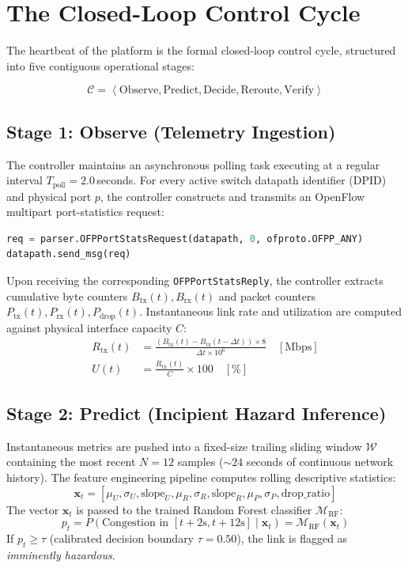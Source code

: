 \section{The Closed-Loop Control Cycle}
The heartbeat of the platform is the formal closed-loop control cycle, structured into five contiguous operational stages:

\begin{equation}
  \mathcal{C} = \left\langle \text{Observe}, \text{Predict}, \text{Decide}, \text{Reroute}, \text{Verify} \right\rangle
\end{equation}

\subsection{Stage 1: Observe (Telemetry Ingestion)}
The controller maintains an asynchronous polling task executing at a regular interval $T_{\text{poll}} = 2.0$\,seconds. For every active switch datapath identifier (DPID) and physical port $p$, the controller constructs and transmits an OpenFlow multipart port-statistics request:
\begin{lstlisting}[language=Python,caption={OpenFlow 1.3 port statistics request dispatch.}]
req = parser.OFPPortStatsRequest(datapath, 0, ofproto.OFPP_ANY)
datapath.send_msg(req)
\end{lstlisting}

Upon receiving the corresponding \texttt{OFPPortStatsReply}, the controller extracts cumulative byte counters $B_{\text{tx}}(t), B_{\text{rx}}(t)$ and packet counters $P_{\text{tx}}(t), P_{\text{rx}}(t), P_{\text{drop}}(t)$. Instantaneous link rate and utilization are computed against physical interface capacity $C$:
\begin{align}
  R_{\text{tx}}(t) &= \frac{(B_{\text{tx}}(t) - B_{\text{tx}}(t - \Delta t)) \times 8}{\Delta t \times 10^6} \quad [\text{Mbps}]\\
  U(t) &= \frac{R_{\text{tx}}(t)}{C} \times 100 \quad [\%]
\end{align}

\subsection{Stage 2: Predict (Incipient Hazard Inference)}
Instantaneous metrics are pushed into a fixed-size trailing sliding window $\mathcal{W}$ containing the most recent $N=12$ samples ($\sim 24$ seconds of continuous network history). The feature engineering pipeline computes rolling descriptive statistics:
\begin{equation}
  \mathbf{x}_t = \left[ \mu_U, \sigma_U, \text{slope}_U, \mu_{R}, \sigma_{R}, \text{slope}_{R}, \mu_{P}, \sigma_{P}, \text{drop\_ratio} \right]
\end{equation}
The vector $\mathbf{x}_t$ is passed to the trained Random Forest classifier $\mathcal{M}_{\text{RF}}$:
\begin{equation}
  p_t = P(\text{Congestion in } [t + 2\text{s}, t + 12\text{s}] \mid \mathbf{x}_t) = \mathcal{M}_{\text{RF}}(\mathbf{x}_t)
\end{equation}
If $p_t \ge \tau$ (calibrated decision boundary $\tau = 0.50$), the link is flagged as \textit{imminently hazardous}.

